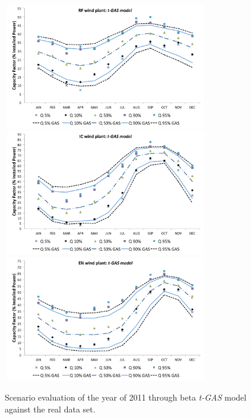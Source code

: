 \documentclass[a4paper]{IEEEtran}
\begin{document}
\begin{figure}[htbp]
\centering
\includegraphics[height=5.5cm,width=9.0cm]{figures/RF_BETA_GAS.pdf}
\includegraphics[height=5.5cm,width=9.0cm]{figures/IC_BETA_GAS.pdf}
\includegraphics[height=5.5cm,width=9.0cm]{figures/EN_BETA_GAS.pdf}
\caption{Scenario evaluation of the year of 2011 through beta \emph{t-GAS} model against the real data set.}
\label{analise_cenarios_gas}
\end{figure}
\end{document}
